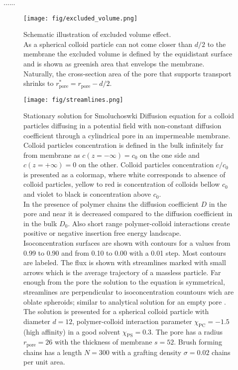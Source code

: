 \documentclass[12pt, a4paper]{article}
\begin{document}
......
\begin{figure}
    \centering
    \texttt{[image: fig/excluded\_volume.png]}
    \caption{
        Schematic illustration of excluded volume effect.
        \\
        As a spherical colloid particle can not come closer than $d/2$ to the membrane the excluded volume is defined by the equidistant surface and is shown as greenish area that envelops the membrane.
        Naturally, the cross-section area of the pore that supports transport shrinks to $r_{\textrm{pore}}^{\ast} = r_{\textrm{pore}} - d/2$.
    }
    \label{fig:excluded_volume}
\end{figure}

\begin{figure}
    \centering
    \texttt{[image: fig/streamlines.png]}
    \caption{
    Stationary solution for Smoluchoswki Diffusion equation for a colloid particles diffusing in a potential field with non-constant diffusion coefficient through a cylindrical pore in an impermeable membrane. Colloid particles concentration is defined in the bulk infinitely far from membrane as $c(z=-\infty) = c_0$ on the one side and $c(z=+\infty) = 0$ on the other. Colloid particles concentration $c/c_0$ is presented as a colormap, where white corresponds to absence of colloid particles, yellow to red is concentration of colloids bellow $c_0$ and violet to black is concentration above $c_0$.
    \\
    In the presence of polymer chains the diffusion coefficient $D$ in the pore and near it is decreased compared to the diffusion coefficient in in the bulk $D_0$. Also short range polymer-colloid interactions create positive or negative insertion free energy landscape.
    \\
    Isoconcentration surfaces are shown with contours for a values from 0.99 to 0.90 and from 0.10 to 0.00 with a 0.01 step. Most contours are labeled.
    The flux is shown with streamlines marked with small arrows which is the average trajectory of a massless particle. 
    Far enough from the pore the solution to the equation is symmetrical, streamlines are perpendicular to isoconcentration countours wich are oblate spheroids; similar to analytical solution for an empty pore \cite{Brunn, 1984}. 
    \\
    The solution is presented for a spherical colloid particle with diameter $d = 12$, polymer-colloid interaction parameter $\chi_{\textrm{PC}} = -1.5$ (high affinity) in a good solvent $\chi_{\textrm{PS}} = 0.3$. 
    The pore has a radius $r_{\textrm{pore}} = 26$ with the thickness of membrane $s = 52$.
    Brush forming chains has a length $N=300$ with a grafting density $\sigma = 0.02$ chains per unit area.
    }
    \label{fig:streamlines}
\end{figure}
\end{document}
